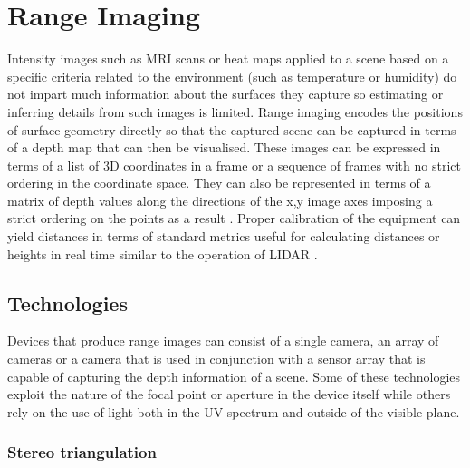 \section{Range Imaging}
\label{res:range imaging}

Intensity images such as MRI scans or heat maps applied to a scene based on a specific criteria related to the environment (such as temperature or humidity) do not impart much information about the surfaces they capture so estimating or inferring details from such images is limited. Range imaging encodes the positions of surface geometry directly so that the captured scene can be captured in terms of a depth map that can then be visualised. These images can be expressed in terms of a list of 3D coordinates in a frame or a sequence of frames with no strict ordering in the coordinate space. They can also be represented in terms of a matrix of depth values along the directions of the x,y image axes imposing a strict ordering on the points as a result \cite{Helmut2002}. Proper calibration of the equipment can yield distances in terms of standard metrics useful for calculating distances or heights in real time similar to the operation of LIDAR \cite{Maltamo2006}. 


\subsection{Technologies}

Devices that produce range images can consist of a single camera, an array of cameras or a camera that is used in conjunction with a sensor array that is capable of capturing the depth information of a scene. Some of these technologies exploit the nature of the focal point or aperture in the device itself while others rely on the use of light both in the UV spectrum and outside of the visible plane.

\subsubsection{Stereo triangulation}

